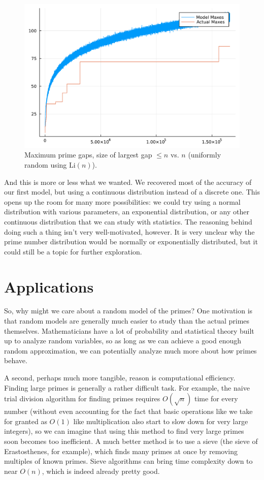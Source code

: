 \documentclass[conference]{IEEEtran}
\begin{document}
\begin{figure}[H]
  \centering
  \includegraphics[width=\linewidth,keepaspectratio]{random_model_li.pdf}
  \caption{Maximum prime gaps, size of largest gap $\le n$ vs. $n$ (uniformly random using $\mathrm{Li}(n)$).}
\end{figure}

And this is more or less what we wanted. We recovered
most of the accuracy of our first model, but using a
continuous distribution instead of a discrete one. This
opens up the room for many more possibilities: we could
try using a normal distribution with various parameters,
an exponential distribution, or any other continuous
distribution that we can study with statistics. The
reasoning behind doing such a thing isn't very
well-motivated, however.
It is very unclear why the prime number distribution would
be normally or exponentially distributed, but it could
still be a topic for further exploration.

\section{Applications}
So, why might we care about a random model of the primes?
One motivation is that random models are generally much
easier to study than the actual primes themselves.
Mathematicians have a lot of probability and statistical
theory built up to analyze random variables, so as long
as we can achieve a good enough random approximation, we
can potentially analyze much more about how primes behave.

A second, perhaps much more tangible, reason is
computational efficiency. Finding large primes is
generally a rather difficult task. For example, the naive
trial division algorithm for finding primes requires
$O(\sqrt{n})$ time for every number (without even
accounting for the fact that basic operations like
we take for granted as $O(1)$ like multiplication also
start to slow down for very large integers),
so we can imagine that
using this method to find very large primes soon becomes
too inefficient. A much better method is to
use a sieve (the sieve of Erastosthenes, for example),
which finds many primes at once by removing multiples of
known primes. Sieve algorithms can bring time complexity
down to near $O(n)$, which is indeed already pretty good. 
\end{document}
